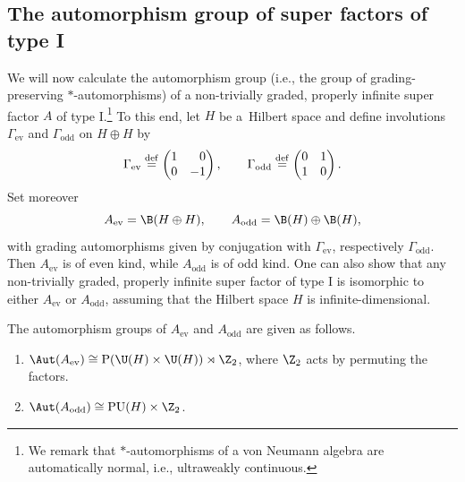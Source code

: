 \subsection{The automorphism group of super factors of type I}

We will now calculate the automorphism group (i.e., the group of grading-preserving $*$-automor\-phisms) of a non-trivially graded, properly infinite super factor $A$ of type I.\footnote{We remark that $*$-automorphisms of a von Neumann algebra are automatically normal, i.e., ultraweakly continuous.}
To this end, let $H$ be a~Hilbert space and define involutions $\Gamma_{\mathrm{ev}}$ and $\Gamma_{\mathrm{odd}}$ on $H\oplus H$ by
\begin{equation} \label{GammaMatrices}
\Gamma_{\mathrm{ev}}  \stackrel{\mathrm{def}}{=}  \begin{pmatrix} 1 & \hphantom{-}0 \\ 0 & -1 \end{pmatrix}, \qquad
\Gamma_{\mathrm{odd}}  \stackrel{\mathrm{def}}{=}  \begin{pmatrix} 0 & 1 \\ 1 & 0 \end{pmatrix}.
\end{equation}
Set moreover
\begin{equation*}
 A_{\mathrm{ev}} = \B(H \oplus H), \qquad A_{\mathrm{odd}} = \B(H) \oplus \B(H),
\end{equation*}
with grading automorphisms given by conjugation with $\Gamma_{\mathrm{ev}}$, respectively $\Gamma_{\mathrm{odd}}$.
Then $A_{\mathrm{ev}}$ is of even kind, while $A_{\mathrm{odd}}$ is of odd kind.
One can also show that any non-trivially graded, properly infinite super factor of type I is isomorphic to either $A_{\mathrm{ev}}$ or $A_{\mathrm{odd}}$, assuming that the Hilbert space $H$ is infinite-dimensional.

\begin{Proposition} \label{PropositionAutomorphismGroups}
The automorphism groups of $A_{\mathrm{ev}}$ and $A_{\mathrm{odd}}$ are given as follows.
\begin{enumerate}\itemsep=0pt
\item[$(i)$] $\Aut(A_{\mathrm{ev}}) \cong \mathrm{P}(\U(H) \times \U(H)) \rtimes \Z_2$, where $\Z_2$ acts by permuting the factors.
\item[$(ii)$] $\Aut(A_{\mathrm{odd}}) \cong \mathrm{PU}(H) \times \Z_2$.
\end{enumerate}
\end{Proposition}

